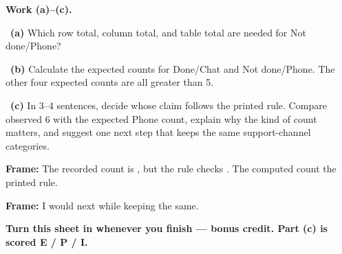 \documentclass[11pt]{article}
\begin{document}
\newpage
\textbf{Work (a)--(c).}\par\smallskip

~\textbf{(a)} Which row total, column total, and table total are needed for Not done/Phone?\par
\workspace{0.7in}

~\textbf{(b)} Calculate the expected counts for Done/Chat and Not done/Phone. The other four expected counts are all greater than 5.\par
\workspace{1.4in}

~\textbf{(c)} In 3--4 sentences, decide whose claim follows the printed rule. Compare observed 6 with the expected Phone count, explain why the kind of count matters, and suggest one next step that keeps the same support-channel categories.\par
\workspace{2.0in}

\begin{sentenceframebox}\raggedright\textbf{Frame:} The recorded count is \blank[0.6in], but the rule checks \blank[1.4in]. The computed count \blank[1.2in] the printed rule.\end{sentenceframebox}

\begin{sentenceframebox}\raggedright\textbf{Frame:} I would next \blank[2.1in] while keeping \blank[1.8in] the same.\end{sentenceframebox}

\textbf{Turn this sheet in whenever you finish --- bonus credit. Part (c) is scored E / P / I.}\par
\end{document}
